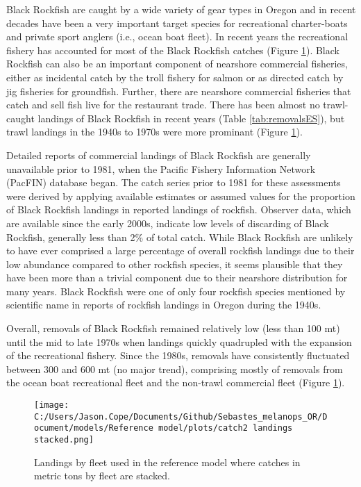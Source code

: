 \documentclass[11pt,
  english,
  letterpaper,
]{article}
\begin{document}
Black Rockfish are caught by a wide variety of gear types in Oregon and in recent decades have been a very important target species for recreational charter-boats and private sport anglers (i.e., ocean boat fleet). In recent years the recreational fishery has accounted for most of the Black Rockfish catches (Figure \ref{fig:es-catch}). Black Rockfish can also be an important component of nearshore commercial fisheries, either as incidental catch by the troll fishery for salmon or as directed catch by jig fisheries for groundfish. Further, there are nearshore commercial fisheries that catch and sell fish live for the restaurant trade. There has been almost no trawl-caught landings of Black Rockfish in recent years (Table \ref{tab:removalsES}), but trawl landings in the 1940s to 1970s were more prominant (Figure \ref{fig:es-catch}).

Detailed reports of commercial landings of Black Rockfish are generally unavailable prior to 1981, when the Pacific Fishery Information Network (PacFIN) database began. The catch series prior to 1981 for these assessments were derived by applying available estimates or assumed values for the proportion of Black Rockfish landings in reported landings of rockfish. Observer data, which are available since the early 2000s, indicate low levels of discarding of Black Rockfish, generally less than 2\% of total catch. While Black Rockfish are unlikely to have ever comprised a large percentage of overall rockfish landings due to their low abundance compared to other rockfish species, it seems plausible that they have been more than a trivial component due to their nearshore distribution for many years. Black Rockfish were one of only four rockfish species mentioned by scientific name in reports of rockfish landings in Oregon during the 1940s.

Overall, removals of Black Rockfish remained relatively low (less than 100 mt) until the mid to late 1970s when landings quickly quadrupled with the expansion of the recreational fishery. Since the 1980s, removals have consistently fluctuated between 300 and 600 mt (no major trend), comprising mostly of removals from the ocean boat recreational fleet and the non-trawl commercial fleet (Figure \ref{fig:es-catch}).



\begin{figure}
\centering
\texttt{[image: C:/Users/Jason.Cope/Documents/Github/Sebastes\_melanops\_OR/Document/models/Reference model/plots/catch2 landings stacked.png]}
\caption{Landings by fleet used in the reference model where catches in metric tons by fleet are stacked.\label{fig:es-catch}}
\end{figure}
\end{document}

